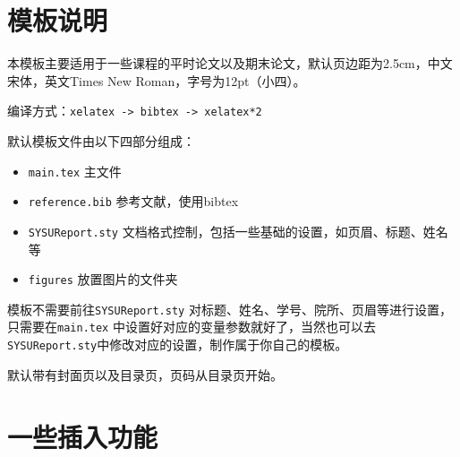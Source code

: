 \documentclass{SYSUReport}
\date{\today}
\begin{document}
\cover

%
%

\thispagestyle{empty} %

\newpage
\setcounter{page}{1}
\tableofcontents

\newpage
\setcounter{page}{1}


\section{模板说明}
本模板主要适用于一些课程的平时论文以及期末论文，默认页边距为2.5cm，中文宋体，英文Times New Roman，字号为12pt（小四）。

编译方式：\verb|xelatex -> bibtex -> xelatex*2|


默认模板文件由以下四部分组成：
\begin{itemize}
    \item \texttt{main.tex} 主文件
    \item \texttt{reference.bib} 参考文献，使用bibtex
    \item \texttt{SYSUReport.sty} 文档格式控制，包括一些基础的设置，如页眉、标题、姓名等
    \item \texttt{figures} 放置图片的文件夹
\end{itemize}

模板不需要前往\texttt{SYSUReport.sty} 对标题、姓名、学号、院所、页眉等进行设置，只需要在\texttt{main.tex} 中设置好对应的变量参数就好了，当然也可以去\texttt{SYSUReport.sty}中修改对应的设置，制作属于你自己的模板。

默认带有封面页以及目录页，页码从目录页开始。

\section{一些插入功能}
\end{document}
